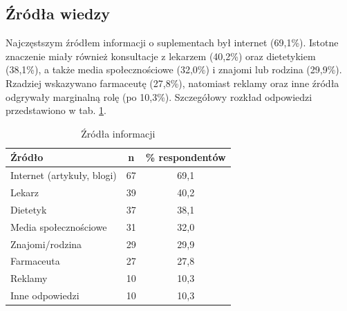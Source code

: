 


\subsection{Źródła wiedzy}

Najczęstszym źródłem informacji o suplementach był internet (69,1\%). Istotne znaczenie miały również konsultacje z lekarzem (40,2\%) oraz dietetykiem (38,1\%), a także media społecznościowe (32,0\%) i znajomi lub rodzina (29,9\%). Rzadziej wskazywano farmaceutę (27,8\%), natomiast reklamy oraz inne źródła odgrywały marginalną rolę (po 10,3\%). Szczegółowy rozkład odpowiedzi przedstawiono w tab. \ref{tab:zrodla-info}.


\begin{table}[H]
    \centering
    \caption{Źródła informacji}
    \label{tab:zrodla-info}
    \begin{tabular}{|l|c|c|}
        \hline
        \textbf{Źródło} & \textbf{n} & \textbf{\% respondentów} \\
        \hline
        \hline
        Internet (artykuły, blogi) & 67 & 69,1 \\
        \hline
        Lekarz & 39 & 40,2 \\
        \hline
        Dietetyk & 37 & 38,1 \\
        \hline
        Media społecznościowe  & 31 & 32,0 \\
        \hline
        Znajomi/rodzina & 29 & 29,9 \\
        \hline
        Farmaceuta & 27 & 27,8 \\
        \hline
        Reklamy & 10 & 10,3 \\
        \hline
        Inne odpowiedzi & 10  & 10,3 \\
        \hline
    \end{tabular}
\end{table}

